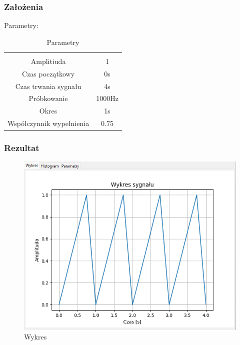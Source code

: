 \documentclass{article}
\begin{document}
\subsubsection{Założenia}
\noindent
Parametry:
\begin{table}[h!]
    \centering
    \vspace{0.2cm}
    \begin{tabular}{|c|c|}
        \hline\hline\\[-0.4cm]
        Amplitiuda & 1  \\
        \hline
        Czas początkowy & 0s  \\
        \hline
        Czas trwania sygnału & 4s  \\
        \hline
        Próbkowanie & 1000Hz \\
        \hline
        Okres & 1s\\
        \hline
        Współczynnik wypełnienia & 0.75\\
        \hline
    \end{tabular}
    \caption{Parametry}
    \label{trojkat}
\end{table}
\subsubsection{Rezultat}
\begin{figure}[h!]
    \centering
    \includegraphics[width=\textwidth]{img/trojkat/wykres.png}
    \caption{Wykres}
\end{figure}
\end{document}
